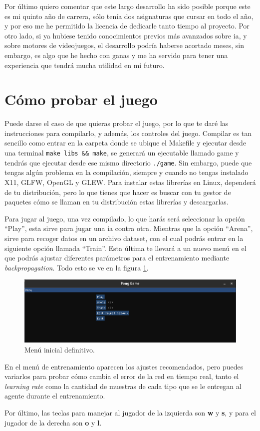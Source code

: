 Por último quiero comentar que este largo desarrollo ha sido posible porque este es mi quinto año de carrera, sólo tenía dos asignaturas que cursar en todo el año, y por eso me he permitido la licencia de dedicarle tanto tiempo al proyecto. Por otro lado, si ya hubiese tenido conocimientos previos más avanzados sobre \gls{ia}, y sobre motores de videojuegos, el desarrollo podría haberse acortado meses, sin embargo, es algo que he hecho con ganas y me ha servido para tener una experiencia que tendrá mucha utilidad en mi futuro.

\section{Cómo probar el juego}
Puede darse el caso de que quieras probar el juego, por lo que te daré las instrucciones para compilarlo, y además, los controles del juego.
Compilar es tan sencillo como entrar en la carpeta donde se ubique el Makefile y ejecutar desde una terminal \texttt{make libs \&\& make}, se generará un ejecutable llamado game y tendrás que ejecutar desde ese mismo directorio \texttt{./game}. Sin embargo, puede que tengas algún problema en la compilación, siempre y cuando no tengas instalado X11, GLFW, OpenGL y GLEW. Para instalar estas librerías en Linux, dependerá de tu distribución, pero lo que tienes que hacer es buscar con tu gestor de paquetes cómo se llaman en tu distribución estas librerías y descargarlas.

Para jugar al juego, una vez compilado, lo que harás será seleccionar la opción ``Play'', esta sirve para jugar una \gls{ia} contra otra. Mientras que la opción ``Arena'', sirve para recoger datos en un archivo dataset, con el cual podrás entrar en la siguiente opción llamada ``Train''. Esta última te llevará a un nuevo menú en el que podrás ajustar diferentes parámetros para el entrenamiento mediante \textit{backpropagation}. Todo esto se ve en la figura \ref{Menu inicial definitivo}.
\begin{figure}[H]
	\centering
	\includegraphics[width=15cm]{archivos/imagenes/menu-inicia-definitivo.png}
	\caption{Menú inicial definitivo.}
	\label{Menu inicial definitivo}
\end{figure}

En el menú de entrenamiento aparecen los ajustes recomendados, pero puedes variarlos para probar cómo cambia el error de la red en tiempo real, tanto el \textit{learning rate} como la cantidad de muestras de cada tipo que se le entregan al agente durante el entrenamiento.

Por último, las teclas para manejar al jugador de la izquierda son \textbf{w} y \textbf{s}, y para el jugador de la derecha son \textbf{o} y \textbf{l}.